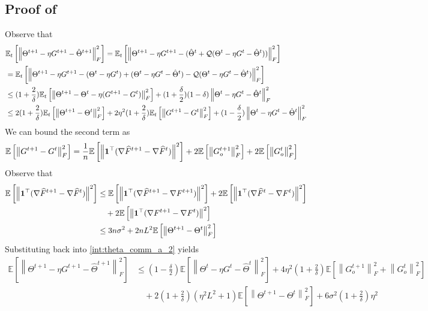 \documentclass[10pt]{article} %
\theoremstyle{plain}
\theoremstyle{definition}
\theoremstyle{remark}
\newcommand{\grdF}{\nabla F}
\newcommand{\norm}[1]{\left\| #1 \right\|}
\newcommand{\nl}{\nonumber\\}
\newcommand{\grdSF}{\nabla \widehat{F}}
\begin{document}
\subsection{Proof of } \label{app:pf_t_comm}
Observe that 
\begin{align}
    & \mathbb{E}_t \left[ \norm{\Theta^{t+1}- \eta G^{t+1}- \hat{\Theta}^{t+1}}_F^2 \right] = \mathbb{E}_t \left[ \norm{\Theta^{t+1}- \eta G^{t+1}- (\hat{\Theta}^t + {\cal Q}(\Theta^t - \eta G^t - \hat{\Theta}^t ))}_F^2 \right] 
    \nl &= \mathbb{E}_t \left[ \norm{\Theta^{t+1}- \eta G^{t+1}- (\Theta^t - \eta G^t) + (\Theta^t - \eta G^t - \hat{\Theta}^t) - {\cal Q}(\Theta^t - \eta G^t - \hat{\Theta}^t )}_F^2 \right]
    \nl & \leq (1+\frac{2}{\delta}) \mathbb{E}_t \left[ \norm{\Theta^{t+1}- \Theta^t - \eta(G^{t+1}- G^t)}_F^2 \right] + (1+\frac{\delta}{2})(1-\delta)\norm{\Theta^t - \eta G^t - \hat{\Theta}^t}_F^2
    \nl &\leq 2(1+\frac{2}{\delta}) \mathbb{E}_t \left[ \norm{\Theta^{t+1}- \Theta^t}_F^2 \right] + 2\eta^2 (1+\frac{2}{\delta}) \mathbb{E}_t \left[ \norm{G^{t+1}- G^t}_F^2 \right]
     + (1-\frac{\delta}{2})\norm{\Theta^t - \eta G^t - \hat{\Theta}^t}_F^2 
     \label{int:theta_comm_a_2}
\end{align}
We can bound the second term as 
\begin{align}
    \mathbb{E} \left[ \norm{G^{t+1} - G^t}_F^2 \right] & = \frac{1}{n} \mathbb{E} \left[ \norm{ {\bf 1}^\top ( \grdSF^{t+1} - \grdSF^t )}^2 \right] + 2 \mathbb{E} \left[ \norm{ G_o^{t+1} }_F^2 \right] + 2 \mathbb{E} \left[ \norm{ G_o^{t} }_F^2 \right] \nonumber
\end{align}
Observe that 
\begin{align}
\mathbb{E} \left[ \norm{ {\bf 1}^\top ( \grdSF^{t+1} - \grdSF^t )}^2 \right] & \leq \mathbb{E} \left[ \norm{ {\bf 1}^\top ( \grdSF^{t+1} - \grdF^{t+1} )}^2 \right] + 2 \mathbb{E} \left[ \norm{ {\bf 1}^\top ( \grdSF^{t} - \grdF^{t} )}^2 \right] \nonumber \\
& \quad + 2 \mathbb{E} \left[ \norm{ {\bf 1}^\top ( \grdF^{t+1} - \grdF^{t} )}^2 \right] \nl 
& \leq 3 n \sigma^2 + 2 n L^2 \mathbb{E} \left[ \norm{ \Theta^{t+1} - \Theta^t }_F^2 \right] \nonumber 
\end{align}
Substituting back into \eqref{int:theta_comm_a_2} yields
\begin{align}
    \mathbb{E} \left[ \norm{\Theta^{t+1}- \eta G^{t+1}- \hat{\Theta}^{t+1}}_F^2 \right] & \leq (1-\frac{\delta}{2}) \mathbb{E} \left[ \norm{\Theta^t - \eta G^t - \hat{\Theta}^t}_F^2 \right] + 4 \eta^2 ( 1 + \frac{2}{\delta}) \mathbb{E} \left[ \norm{G_o^{t+1}}_F^2 + \norm{G_o^t}_F^2 \right] \nl 
    & \quad + 2(1 + \frac{2}{\delta}) ( \eta^2 L^2 + 1 ) \mathbb{E} \left[ \norm{ \Theta^{t+1} - \Theta^t }_F^2 \right] + 6 \sigma^2 (1 + \frac{2}{\delta}) \eta^2 
\end{align}
\end{document}

